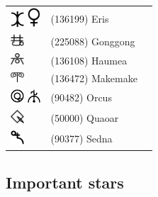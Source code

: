 \documentclass[british,final,landscape]{scrartcl}
\begin{document}
\begin{refsection}
 \tablelasttail{\bottomrule}
 \begin{supertabular}{p{0.3\textwidth}p{0.34\textwidth}p{0.34\textwidth}}
  \includegraphics[width=5mm]{Astrology/Eris1} \includegraphics[width=5mm]{Astrology/Eris2} & (136199) Eris  & \\
  \includegraphics[width=5mm]{Astrology/Gonggong} & (225088) Gonggong & \\
  \includegraphics[width=5mm]{Astrology/Haumea}   & (136108) Haumea  & \\
  \includegraphics[width=5mm]{Astrology/Makemake} & (136472) Makemake  & \\
  \includegraphics[width=5mm]{Astrology/Orcus} \includegraphics[width=5mm]{Astrology/Orcus2} & (90482) Orcus  & \\
  \includegraphics[width=5mm]{Astrology/Quaoar}   & (50000) Quaoar   & \\
  \includegraphics[width=5mm]{Astrology/Sedna}    & (90377) Sedna  & \\
  \end{supertabular}

\subsection{Important stars}


\end{refsection}
\end{document}
